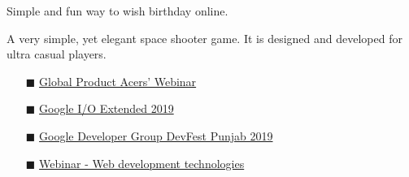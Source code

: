  {Simple and fun way to wish birthday online.}


    { A very simple, yet elegant space shooter game. It is designed and developed for ultra casual players. } 

    

\begin{itemize}
    \item [$\blacksquare$] \href{https://www.linkedin.com/video/event/urn:li:ugcPost:6914574200020094976/}   {Global Product Acers' Webinar }
      \item [$\blacksquare$] \href{https://www.linkedin.com/posts/sarthak-jain24apr98_io19extended-google-io-activity-6542084758430674944-dDkg }   {Google I/O Extended 2019 }
    \item [$\blacksquare$] \href{https://www.linkedin.com/posts/sarthak-jain24apr98_devfest-googledevelopergroups-womentechmakers-activity-6588625422014091264-Pbc-/} {Google Developer Group DevFest Punjab 2019}
     
     \item [$\blacksquare$] \href{https://www.youtube.com/watch?v=6RS0q9Oih2E&feature=youtu.be&t=368 } {Webinar - Web development technologies}
   
    
    
    \end{itemize}

  
 \newline 
 



